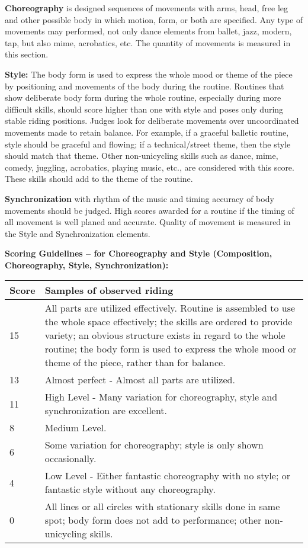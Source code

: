\textbf{Choreography} is designed sequences of movements with arms, head, free leg and other possible body in which motion, form, or both are specified.
Any type of movements may performed, not only dance elements from ballet, jazz, modern, tap, but also mime, acrobatics, etc.
The quantity of movements is measured in this section.

\textbf{Style:} The body form is used to express the whole mood or theme of the piece by positioning and movements of the body during the routine.
Routines that show deliberate body form during the whole routine, especially during more difficult skills, should score higher than one with style and poses only during stable riding positions.
Judges look for deliberate movements over uncoordinated movements made to retain balance.
For example, if a graceful balletic routine, style should be graceful and flowing; if a technical/street theme, then the style should match that theme.
Other non-unicycling skills such as dance, mime, comedy, juggling, acrobatics, playing music, etc., are considered with this score.
These skills should add to the theme of the routine.

\textbf{Synchronization} with rhythm of the music and timing accuracy of body movements should be judged.
High scores awarded for a routine if the timing of all movement is well planed and accurate.
Quality of movement is measured in the Style and Synchronization elements.

\textbf{Scoring Guidelines – for Choreography and Style (Composition, Choreography, Style, Synchronization):} 

\begin{tabular}{|l|p{12.5cm}|}
\hline
\textbf{Score} & \textbf{Samples of observed riding} \\
\hline
15 & All parts are utilized effectively. Routine is assembled to use the whole space effectively; the skills are ordered to provide variety; an obvious structure exists in regard to the whole routine; the body form is used to express the whole mood or theme of the piece, rather than for balance.  \\
\hline
13 & Almost perfect - Almost all parts are utilized. \\
\hline
11 & High Level - Many variation for choreography, style and synchronization are excellent. \\
\hline
8 & Medium Level. \\
\hline
6 & Some variation for choreography; style is only shown occasionally. \\
\hline
4 & Low Level - Either fantastic choreography with no style; or fantastic style without any choreography. \\
\hline
0 & All lines or all circles with stationary skills done in same spot; body form does not add to performance; other non-unicycling skills. \\
\hline
\end{tabular}

